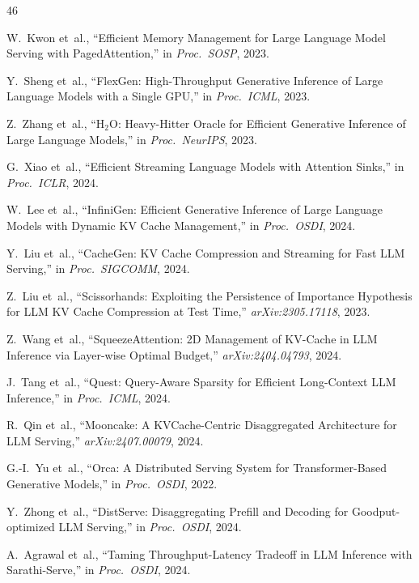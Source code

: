 \documentclass[conference]{IEEEtran}
\begin{document}
\balance

\begin{thebibliography}{46}

 W.~Kwon et~al., ``Efficient Memory Management for Large Language Model Serving with PagedAttention,'' in \textit{Proc.\ SOSP}, 2023.

 Y.~Sheng et~al., ``FlexGen: High-Throughput Generative Inference of Large Language Models with a Single GPU,'' in \textit{Proc.\ ICML}, 2023.

 Z.~Zhang et~al., ``H$_2$O: Heavy-Hitter Oracle for Efficient Generative Inference of Large Language Models,'' in \textit{Proc.\ NeurIPS}, 2023.

 G.~Xiao et~al., ``Efficient Streaming Language Models with Attention Sinks,'' in \textit{Proc.\ ICLR}, 2024.

 W.~Lee et~al., ``InfiniGen: Efficient Generative Inference of Large Language Models with Dynamic KV Cache Management,'' in \textit{Proc.\ OSDI}, 2024.

 Y.~Liu et~al., ``CacheGen: KV Cache Compression and Streaming for Fast LLM Serving,'' in \textit{Proc.\ SIGCOMM}, 2024.

 Z.~Liu et~al., ``Scissorhands: Exploiting the Persistence of Importance Hypothesis for LLM KV Cache Compression at Test Time,'' \textit{arXiv:2305.17118}, 2023.

 Z.~Wang et~al., ``SqueezeAttention: 2D Management of KV-Cache in LLM Inference via Layer-wise Optimal Budget,'' \textit{arXiv:2404.04793}, 2024.

 J.~Tang et~al., ``Quest: Query-Aware Sparsity for Efficient Long-Context LLM Inference,'' in \textit{Proc.\ ICML}, 2024.

 R.~Qin et~al., ``Mooncake: A KVCache-Centric Disaggregated Architecture for LLM Serving,'' \textit{arXiv:2407.00079}, 2024.

 G.-I.~Yu et~al., ``Orca: A Distributed Serving System for Transformer-Based Generative Models,'' in \textit{Proc.\ OSDI}, 2022.

 Y.~Zhong et~al., ``DistServe: Disaggregating Prefill and Decoding for Goodput-optimized LLM Serving,'' in \textit{Proc.\ OSDI}, 2024.

 A.~Agrawal et~al., ``Taming Throughput-Latency Tradeoff in LLM Inference with Sarathi-Serve,'' in \textit{Proc.\ OSDI}, 2024.


\end{thebibliography}
\end{document}
